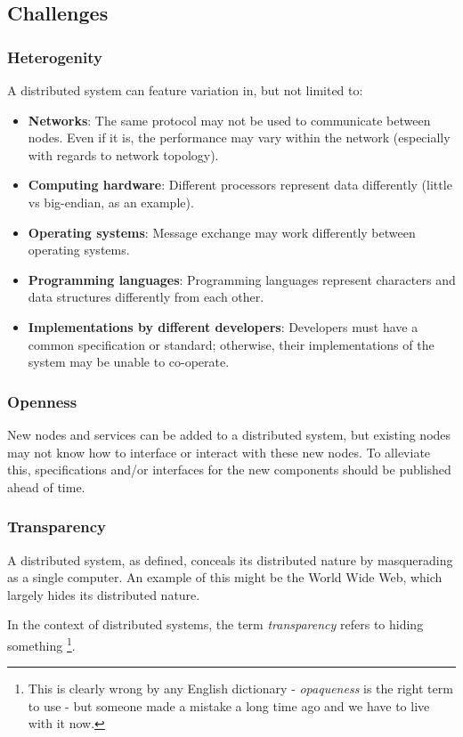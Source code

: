 \subsection{Challenges}
\subsubsection{Heterogenity}
A distributed system can feature variation in, but not limited to:
\begin{itemize}
	\item \textbf{Networks}: The same protocol may not be used to communicate between nodes. Even if it is, the performance may vary within the network (especially with regards to network topology).
	\item \textbf{Computing hardware}: Different processors represent data differently (little vs big-endian, as an example).
	\item \textbf{Operating systems}: Message exchange may work differently between operating systems.
	\item \textbf{Programming languages}: Programming languages represent characters and data structures differently from each other.
	\item \textbf{Implementations by different developers}: Developers must have a common specification or standard; otherwise, their implementations of the system may be unable to co-operate.
\end{itemize}

\subsubsection{Openness}
New nodes and services can be added to a distributed system, but existing nodes may not know how to interface or interact with these new nodes. To alleviate this, specifications and/or interfaces for the new components should be published ahead of time.

\subsubsection{Transparency}
\label{sssec:transparency}
A distributed system, as defined, conceals its distributed nature by masquerading as a single computer. An example of this might be the World Wide Web, which largely hides its distributed nature.

In the context of distributed systems, the term \textit{transparency} refers to hiding something \footnote{This is clearly wrong by any English dictionary - \textit{opaqueness} is the right term to use - but someone made a mistake a long time ago and we have to live with it now.}.

